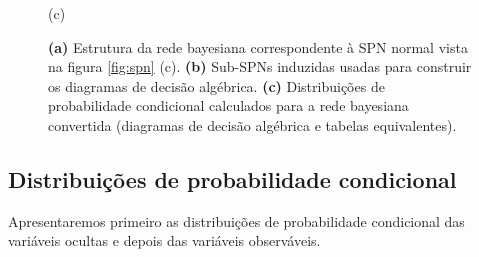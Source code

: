 \begin{figure}
\begin{minipage}{0.3333\textwidth}
{
    }

    (c)
  \end{minipage}

  \caption{
    \textbf{(a)} Estrutura da rede bayesiana correspondente à SPN normal vista na figura \ref{fig:spn} (c).
    \textbf{(b)} Sub-SPNs induzidas usadas para construir os diagramas de decisão algébrica.
    \textbf{(c)} Distribuições de probabilidade condicional calculados para a rede bayesiana convertida (diagramas de decisão algébrica e tabelas equivalentes).
  }
  \label{fig:algorithm}
\end{figure}

\subsection{Distribuições de probabilidade condicional}

Apresentaremos primeiro as distribuições de probabilidade condicional das variáveis ocultas e depois das variáveis observáveis.

